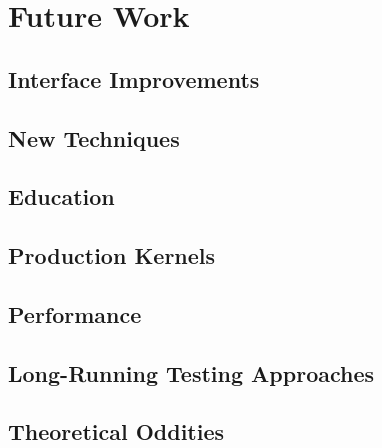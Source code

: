 \section{Future Work}
\label{sec:future}

\subsection{Interface Improvements}
\label{sec:future-interface}

\subsection{New Techniques}
\label{sec:future-new}

\subsection{Education}
\label{sec:future-education}

\subsection{Production Kernels}
\label{sec:future-linux}

\subsection{Performance}
\label{sec:future-perf}

\subsection{Long-Running Testing Approaches}
\label{sec:future-shaping}

\subsection{Theoretical Oddities}
\label{sec:future-theory}
